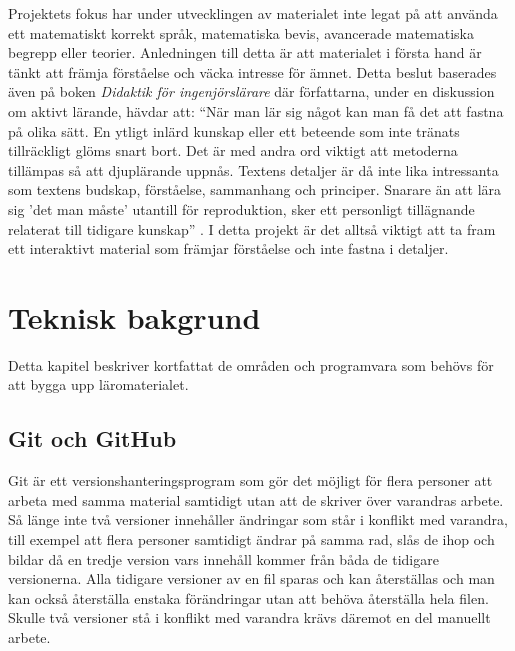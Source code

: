 \documentclass[12pt,a4paper,twoside,openright]{article}
\begin{document}
Projektets fokus har under utvecklingen av materialet inte legat på
att använda ett matematiskt korrekt språk, matematiska bevis,
avancerade matematiska begrepp eller teorier. Anledningen till detta
är att materialet i första hand är tänkt att främja förståelse och
väcka intresse för ämnet. Detta beslut baserades även på boken
\textit{Didaktik för ingenjörslärare} där författarna, under en
diskussion om aktivt lärande, hävdar att: ``När man lär sig något kan
man få det att fastna på olika sätt. En ytligt inlärd kunskap eller
ett beteende som inte tränats tillräckligt glöms snart bort. Det är
med andra ord viktigt att metoderna tillämpas så att djuplärande
uppnås. Textens detaljer är då inte lika intressanta som textens
budskap, förståelse, sammanhang och principer. Snarare än att lära sig
'det man måste' utantill för reproduktion, sker ett personligt
tillägnande relaterat till tidigare kunskap''
\cite{didaktik_for_ingenjorslarare}. I detta projekt är det alltså
viktigt att ta fram ett interaktivt material som främjar förståelse
och inte fastna i detaljer.

\newpage

\section{Teknisk bakgrund}
Detta kapitel beskriver kortfattat de områden och programvara som
behövs för att bygga upp läromaterialet.


\subsection{Git och GitHub}
\gls{Git} är ett versionshanteringsprogram som gör det möjligt för
flera personer att arbeta med samma material samtidigt utan att de
skriver över varandras arbete. Så länge inte två versioner innehåller
ändringar som står i konflikt med varandra, till exempel att flera
personer samtidigt ändrar på samma rad, slås de ihop och bildar då en
tredje version vars innehåll kommer från båda de tidigare
versionerna. Alla tidigare versioner av en fil sparas och kan
återställas och man kan också återställa enstaka förändringar utan att
behöva återställa hela filen. Skulle två versioner stå i konflikt med
varandra krävs däremot en del manuellt arbete.
\end{document}

